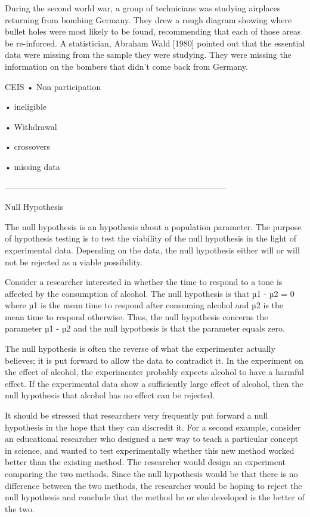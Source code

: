 During the second world war, a group of technicians was studying airplaces returning from bombing Germany. They drew a rough diagram showing where bullet holes were most likely to be found, recommending that each of those areas be re-inforced. A statistician, Abraham Wald [1980] pointed out that the essential data were missing from the sample they were studying. They were missing the information on the bombers that didn't come back from Germany.



CEIS
•
Non participation

•
ineligible

•
Withdrawal

•
crossovers

•
missing data


 

 
--------------------------------------------------------------------------------


Null Hypothesis

The null hypothesis is an hypothesis about a population parameter. The purpose of hypothesis testing is to test the viability of the null hypothesis in the light of experimental data. Depending on the data, the null hypothesis either will or will not be rejected as a viable possibility. 


Consider a researcher interested in whether the time to respond to a tone is affected by the consumption of alcohol. The null hypothesis is that µ1 - µ2 = 0 where µ1 is the mean time to respond after consuming alcohol and µ2 is the mean time to respond otherwise. Thus, the null hypothesis concerns the parameter µ1 - µ2 and the null hypothesis is that the parameter equals zero. 


The null hypothesis is often the reverse of what the experimenter actually believes; it is put forward to allow the data to contradict it. In the experiment on the effect of alcohol, the experimenter probably expects alcohol to have a harmful effect. If the experimental data show a sufficiently large effect of alcohol, then the null hypothesis that alcohol has no effect can be rejected. 


It should be stressed that researchers very frequently put forward a null hypothesis in the hope that they can discredit it. For a second example, consider an educational researcher who designed a new way to teach a particular concept in science, and wanted to test experimentally whether this new method worked better than the existing method. The researcher would design an experiment comparing the two methods. Since the null hypothesis would be that there is no difference between the two methods, the researcher would be hoping to reject the null hypothesis and conclude that the method he or she developed is the better of the two. 



